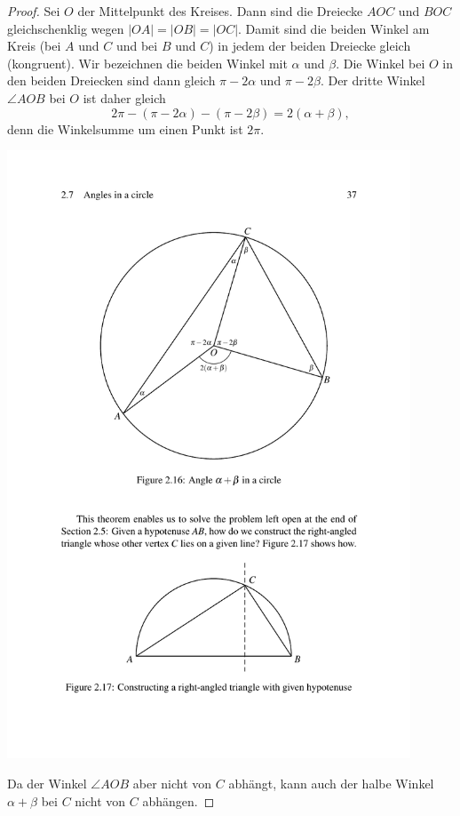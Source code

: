 \begin{proof}
    Sei $O$ der Mittelpunkt des Kreises. Dann sind die Dreiecke $AOC$ und $BOC$ gleichschenklig
    wegen $|OA|=|OB|=|OC|$.  Damit sind die beiden Winkel am Kreis (bei $A$ und $C$ und bei $B$ und
    $C$) in jedem der beiden Dreiecke gleich (kongruent).  Wir bezeichnen die beiden Winkel mit
    $\alpha$ und $\beta$.  Die Winkel bei $O$ in den beiden Dreiecken sind dann gleich $\pi-2\alpha$
    und $\pi-2\beta$.  Der dritte Winkel $\angle AOB$ bei $O$ ist daher gleich
    $$
        2\pi - (\pi-2\alpha) - (\pi-2\beta) = 2 (\alpha + \beta),
    $$
    denn die Winkelsumme um einen Punkt ist $2\pi$.


    \begin{center}
        \includegraphics[width=12cm]{BILDER/BildInnenwinkelImKreis.pdf}
    \end{center}


    Da der Winkel $\angle AOB$ aber nicht von $C$ abhängt, kann auch der halbe Winkel $\alpha+\beta$
    bei $C$ nicht von $C$ abhängen.
\end{proof}

